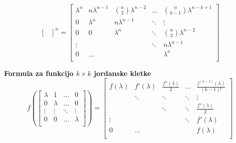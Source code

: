 \documentclass[a4paper,landscape]{article}
\begin{document}
\begin{multicols}{3}
\[\begin{bmatrix}
    \end{bmatrix}^n
    =
    \begin{bmatrix}
        \lambda^n & n\lambda^{n-1} & \binom{n}{2}\lambda^{n-2} & \dots & \binom{n}{k-1}\lambda^{n-k+1} \\
        0 & \lambda^n & n\lambda^{n-1} & \ddots & \vdots \\
        0 & 0 & \lambda^n  & \ddots & \binom{n}{2}\lambda^{n-2} \\
        \vdots &  &  & \ddots & n\lambda^{n-1} \\
        0 & \dots &  &  & \lambda^n \\
    \end{bmatrix}
\]

\textbf{Formula za funkcijo $k \times k$ jordanske kletke}
\[
f(
\begin{bmatrix}
    \lambda & 1   & \dots & 0 \\
    0 & \lambda & \dots & 0 \\
    \vdots & \vdots & \ddots & \vdots \\    
    0 & 0 & \dots & \lambda \\
\end{bmatrix}
)
=
\begin{bmatrix}
    f(\lambda) & f'(\lambda) & \frac{f''(\lambda)}{2} & \dots & \frac{f^{(k-1)}(\lambda)}{(k-1)!} \\
     & \ddots & \ddots & \ddots & \vdots \\
     &  & \ddots & \ddots & \frac{f''(\lambda)}{2} \\
    \vdots &  &  & \ddots & f'(\lambda) \\
    0 & \dots &  &  & f(\lambda) \\
\end{bmatrix}
\]


\end{multicols}
\end{document}
